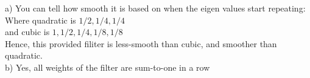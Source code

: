 a)%
You can tell how smooth it is based on when the eigen values start repeating: \\
Where quadratic is $1/2, 1/4, 1/4$ \\
and cubic is $1, 1/2, 1/4, 1/8, 1/8$ \\
Hence, this provided filiter is less-smooth than cubic, and smoother than quadratic. \\
b)
Yes, all weights of the filter are sum-to-one in a row \\
